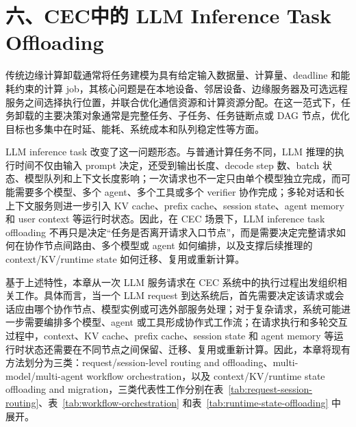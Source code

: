 \section*{六、CEC中的 LLM Inference Task Offloading}

传统边缘计算卸载通常将任务建模为具有给定输入数据量、计算量、deadline 和能耗约束的计算 job，其核心问题是在本地设备、邻居设备、边缘服务器及可选远程服务之间选择执行位置，并联合优化通信资源和计算资源分配。在这一范式下，任务卸载的主要决策对象通常是完整任务、子任务、任务链断点或 DAG 节点，优化目标也多集中在时延、能耗、系统成本和队列稳定性等方面。


LLM inference task 改变了这一问题形态。与普通计算任务不同，LLM 推理的执行时间不仅由输入 prompt 决定，还受到输出长度、decode step 数、batch 状态、模型队列和上下文长度影响；一次请求也不一定只由单个模型独立完成，而可能需要多个模型、多个 agent、多个工具或多个 verifier 协作完成；多轮对话和长上下文服务则进一步引入 KV cache、prefix cache、session state、agent memory 和 user context 等运行时状态。因此，在 CEC 场景下，LLM inference task offloading 不再只是决定“任务是否离开请求入口节点”，而是需要决定完整请求如何在协作节点间路由、多个模型或 agent 如何编排，以及支撑后续推理的 context/KV/runtime state 如何迁移、复用或重新计算。


基于上述特性，本章从一次 LLM 服务请求在 CEC 系统中的执行过程出发组织相关工作。具体而言，当一个 LLM request 到达系统后，首先需要决定该请求或会话应由哪个协作节点、模型实例或可选外部服务处理；对于复杂请求，系统可能进一步需要编排多个模型、agent 或工具形成协作式工作流；在请求执行和多轮交互过程中，context、KV cache、prefix cache、session state 和 agent memory 等运行时状态还需要在不同节点之间保留、迁移、复用或重新计算。因此，本章将现有方法划分为三类：request/session-level routing and offloading、multi-model/multi-agent workflow orchestration，以及 context/KV/runtime state offloading and migration，三类代表性工作分别在表~\ref{tab:request-session-routing}、表~\ref{tab:workflow-orchestration} 和表~\ref{tab:runtime-state-offloading} 中展开。


